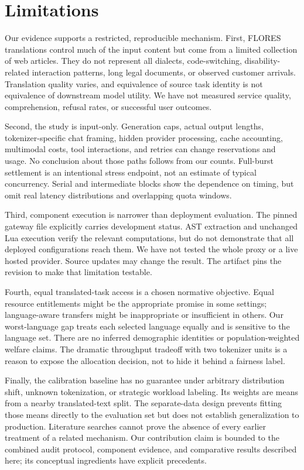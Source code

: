 \documentclass[manuscript,screen]{acmart}
\begin{document}
\section{Limitations}
Our evidence supports a restricted, reproducible mechanism. First, FLORES translations control much of the input content but come from a limited collection of web articles. They do not represent all dialects, code-switching, disability-related interaction patterns, long legal documents, or observed customer arrivals. Translation quality varies, and equivalence of source task identity is not equivalence of downstream model utility. We have not measured service quality, comprehension, refusal rates, or successful user outcomes.

Second, the study is input-only. Generation caps, actual output lengths, tokenizer-specific chat framing, hidden provider processing, cache accounting, multimodal costs, tool interactions, and retries can change reservations and usage. No conclusion about those paths follows from our counts. Full-burst settlement is an intentional stress endpoint, not an estimate of typical concurrency. Serial and intermediate blocks show the dependence on timing, but omit real latency distributions and overlapping quota windows.

Third, component execution is narrower than deployment evaluation. The pinned gateway file explicitly carries development status. AST extraction and unchanged Lua execution verify the relevant computations, but do not demonstrate that all deployed configurations reach them. We have not tested the whole proxy or a live hosted provider. Source updates may change the result. The artifact pins the revision to make that limitation testable.

Fourth, equal translated-task access is a chosen normative objective. Equal resource entitlements might be the appropriate promise in some settings; language-aware transfers might be inappropriate or insufficient in others. Our worst-language gap treats each selected language equally and is sensitive to the language set. There are no inferred demographic identities or population-weighted welfare claims. The dramatic throughput tradeoff with two tokenizer units is a reason to expose the allocation decision, not to hide it behind a fairness label.

Finally, the calibration baseline has no guarantee under arbitrary distribution shift, unknown tokenization, or strategic workload labeling. Its weights are means from a nearby translated-text split. The separate-data design prevents fitting those means directly to the evaluation set but does not establish generalization to production. Literature searches cannot prove the absence of every earlier treatment of a related mechanism. Our contribution claim is bounded to the combined audit protocol, component evidence, and comparative results described here; its conceptual ingredients have explicit precedents.
\end{document}
